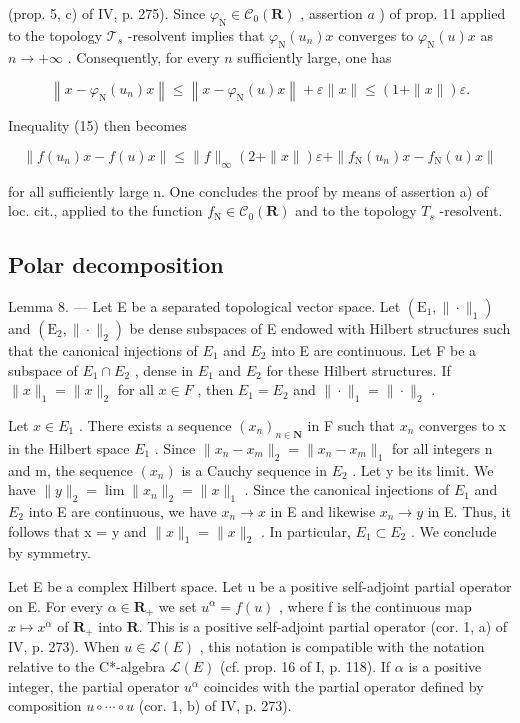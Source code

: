 (prop. 5, c) of IV, p. 275). Since \(\varphi_{\mathrm{N}} \in \mathcal{C}_0(\mathbf{R})\) , assertion \(a\) ) of prop. 11 applied to the topology \(\mathcal{T}_s\) -resolvent implies that \(\varphi_{\mathrm{N}}(u_n)x\) converges to \(\varphi_{\mathrm{N}}(u)x\) as \(n \to +\infty\) . Consequently, for every \(n\) sufficiently large, one has

\[
\left\| x - \varphi_ {\mathrm{N}} (u _ {n}) x \right\| \leqslant \left\| x - \varphi_ {\mathrm{N}} (u) x \right\| + \varepsilon \| x \| \leqslant (1 + \| x \|) \varepsilon .
\]

Inequality (15) then becomes

\[
\| f (u _ {n}) x - f (u) x \| \leqslant \| f \| _ {\infty} (2 + \| x \|) \varepsilon + \| f _ {\mathrm{N}} (u _ {n}) x - f _ {\mathrm{N}} (u) x \|
\]

for all sufficiently large n. One concludes the proof by means of assertion a) of loc. cit., applied to the function \(f_{\mathrm{N}} \in \mathcal{C}_{0}(\mathbf{R})\) and to the topology \(T_{s}\) -resolvent.

\subsection{Polar decomposition}

Lemma 8. --- Let E be a separated topological vector space. Let \((\mathrm{E}_{1},\|\cdot\|_{1})\) and \((\mathrm{E}_{2},\|\cdot\|_{2})\) be dense subspaces of E endowed with Hilbert structures such that the canonical injections of \(E_{1}\) and \(E_{2}\) into E are continuous. Let F be a subspace of \(E_{1}\cap E_{2}\) , dense in \(E_{1}\) and \(E_{2}\) for these Hilbert structures. If \(\|x\|_{1}=\|x\|_{2}\) for all \(x\in F\) , then \(E_{1}=E_{2}\) and \(\|\cdot\|_{1}=\|\cdot\|_{2}\) .

Let \(x \in E_{1}\) . There exists a sequence \((x_{n})_{n \in \mathbf{N}}\) in F such that \(x_{n}\) converges to x in the Hilbert space \(E_{1}\) . Since \(\|x_{n} - x_{m}\|_{2} = \|x_{n} - x_{m}\|_{1}\) for all integers n and m, the sequence \((x_{n})\) is a Cauchy sequence in \(E_{2}\) . Let y be its limit. We have \(\|y\|_{2} = \lim\|x_{n}\|_{2} = \|x\|_{1}\) . Since the canonical injections of \(E_{1}\) and \(E_{2}\) into E are continuous, we have \(x_{n} \to x\) in E and likewise \(x_{n} \to y\) in E. Thus, it follows that x = y and \(\|x\|_{1} = \|x\|_{2}\) . In particular, \(E_{1} \subset E_{2}\) . We conclude by symmetry.

Let E be a complex Hilbert space. Let u be a positive self-adjoint partial operator on E. For every \(\alpha \in \mathbf R_{+}\) we set \(u^{\alpha} = f(u)\) , where f is the continuous map \(x \mapsto x^{\alpha}\) of \(\mathbf R_{+}\) into \(\mathbf R\). This is a positive self-adjoint partial operator (cor. 1, a) of IV, p. 273). When \(u \in \mathcal{L}(E)\) , this notation is compatible with the notation relative to the C*-algebra \(\mathcal{L}(E)\) (cf. prop. 16 of I, p. 118). If \(\alpha\) is a positive integer, the partial operator \(u^{\alpha}\) coincides with the partial operator defined by composition \(u \circ \cdots \circ u\) (cor. 1, b) of IV, p. 273).

